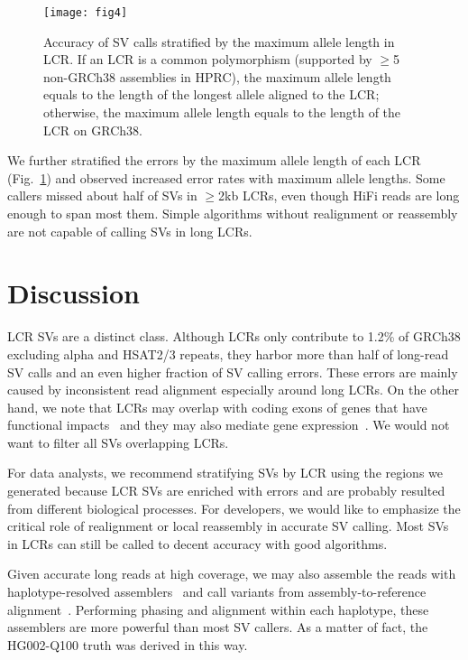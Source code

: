 \documentclass[a4paper,num-refs]{oup-contemporary}
\begin{document}

\begin{figure}[tb]
\texttt{[image: fig4]}
\caption{Accuracy of SV calls stratified by the maximum allele length in LCR.
If an LCR is a common polymorphism (supported by $\ge$5 non-GRCh38 assemblies in HPRC),
the maximum allele length equals to the length of the longest allele aligned to the LCR;
otherwise, the maximum allele length equals to the length of the LCR on GRCh38.
}\label{fig:len}
\end{figure}

We further stratified the errors by the maximum allele length of each LCR (Fig.~\ref{fig:len})
and observed increased error rates with maximum allele lengths.
Some callers missed about half of SVs in $\ge$2kb LCRs,
even though HiFi reads are long enough to span most them.
Simple algorithms without realignment or reassembly
are not capable of calling SVs in long LCRs.

\section{Discussion}

LCR SVs are a distinct class.
Although LCRs only contribute to 1.2\% of GRCh38 excluding alpha and HSAT2/3 repeats,
they harbor more than half of long-read SV calls and an even higher fraction of SV calling errors.
These errors are mainly caused by inconsistent read alignment especially around long LCRs.
On the other hand, we note that LCRs may overlap with coding exons of genes that have functional impacts~\cite{Mukamel:2021aa}
and they may
also mediate gene expression~\cite{Bakhtiari:2021aa,Lu:2023aa}.
We would not want to filter all SVs overlapping LCRs.

For data analysts, we recommend stratifying SVs by LCR using the regions we generated
because LCR SVs are enriched with errors and are probably resulted from different biological processes.
For developers, we would like to emphasize the critical role of realignment or local reassembly in accurate SV calling.
Most SVs in LCRs can still be called to decent accuracy with good algorithms.

Given accurate long reads at high coverage, we may also assemble
the reads with haplotype-resolved assemblers~\cite{Cheng:2021aa,Rautiainen:2023ab}
and call variants from assembly-to-reference alignment~\cite{Li:2018aa}.
Performing phasing and alignment within each haplotype,
these assemblers are more powerful than most SV callers.
As a matter of fact, the HG002-Q100 truth was derived in this way.
\end{document}
